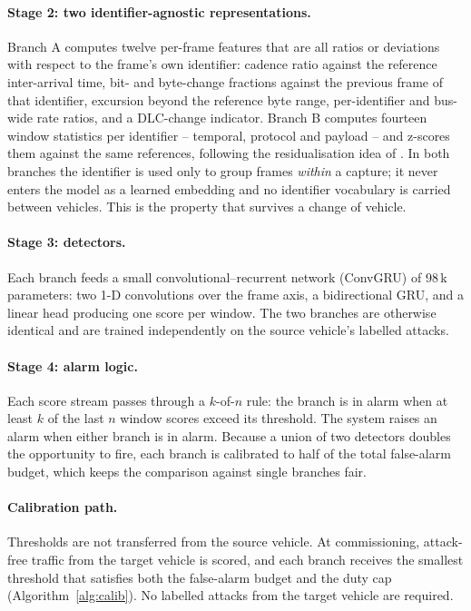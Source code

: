 \documentclass[preprint,11pt,authoryear]{elsarticle}
\begin{document}
\paragraph{Stage 2: two identifier-agnostic representations.} Branch A computes twelve per-frame
features that are all ratios or deviations with respect to the frame's own identifier: cadence ratio
against the reference inter-arrival time, bit- and byte-change fractions against the previous frame
of that identifier, excursion beyond the reference byte range, per-identifier and bus-wide rate
ratios, and a DLC-change indicator. Branch B computes fourteen window statistics per identifier --
temporal, protocol and payload -- and z-scores them against the same references, following the
residualisation idea of \citet{hegde2026residualization}. In both branches the identifier is used
only to group frames \emph{within} a capture; it never enters the model as a learned embedding and
no identifier vocabulary is carried between vehicles. This is the property that survives a change of
vehicle.

\paragraph{Stage 3: detectors.} Each branch feeds a small convolutional--recurrent network
(ConvGRU) of 98\,k parameters: two 1-D convolutions over the frame axis, a bidirectional GRU, and a
linear head producing one score per window. The two branches are otherwise identical and are trained
independently on the source vehicle's labelled attacks.

\paragraph{Stage 4: alarm logic.} Each score stream passes through a $k$-of-$n$ rule: the branch is
in alarm when at least $k$ of the last $n$ window scores exceed its threshold. The system raises an
alarm when either branch is in alarm. Because a union of two detectors doubles the opportunity to
fire, each branch is calibrated to half of the total false-alarm budget, which keeps the comparison
against single branches fair.

\paragraph{Calibration path.} Thresholds are not transferred from the source vehicle. At
commissioning, attack-free traffic from the target vehicle is scored, and each branch receives the
smallest threshold that satisfies both the false-alarm budget and the duty cap
(Algorithm~\ref{alg:calib}). No labelled attacks from the target vehicle are required.
\end{document}

